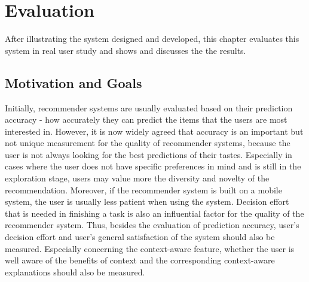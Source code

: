 \chapter{Evaluation}\label{chapter:evaluation}

After illustrating the system designed and developed, this chapter evaluates this system in real user study and shows and discusses the the results.

\section{Motivation and Goals} \label{sec:mg}

Initially, recommender systems are usually evaluated based on their prediction accuracy - how accurately they can predict the items that the users are most interested in. However, it is now widely agreed that accuracy is an important but not unique measurement for the quality of recommender systems, because the user is not always looking for the best predictions of their tastes. Especially in cases where the user does not have specific preferences in mind and is still in the exploration stage, users may value more the diversity and novelty of the recommendation. Moreover, if the recommender system is built on a mobile system, the user is usually less patient when using the system. Decision effort that is needed in finishing a task is also an influential factor for the quality of the recommender system. Thus, besides the evaluation of prediction accuracy, user's decision effort and user's general satisfaction of the system should also be measured. Especially concerning the context-aware feature,  whether the user is well aware of the benefits of context and the corresponding context-aware explanations should also be measured.

